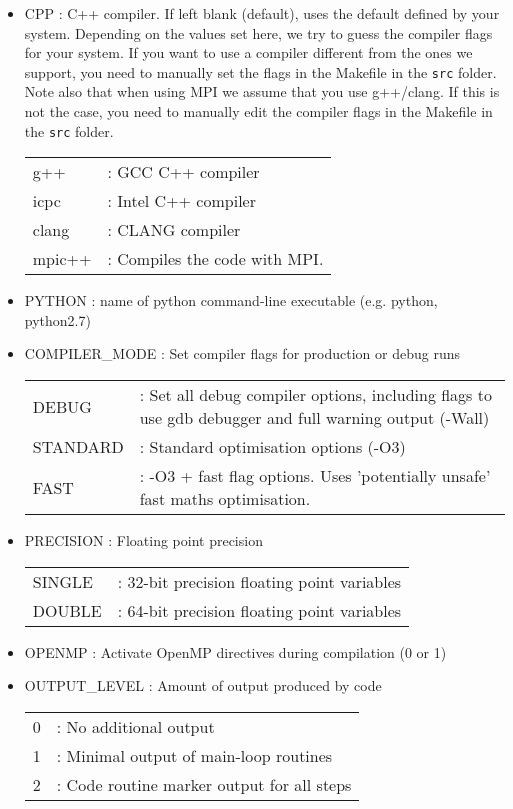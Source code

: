 \documentclass[a4paper]{article}
\newcommand{\var}[1]{\texttt{#1}}
\begin{document}
\begin{itemize}

\item CPP : C++ compiler. If left blank (default), uses the default defined by your system. Depending on the values set here, we try to guess the compiler flags for your system. If you want to use a compiler different from the ones we support, you need to manually set the flags in the Makefile in the \var{src} folder. Note also that when using MPI we assume that you use g++/clang. If this is not the case, you need to manually edit the compiler flags in the Makefile in the \var{src} folder.\\
\begin{tabular}{ll}
g++ & : GCC C++ compiler \\
icpc & : Intel C++ compiler \\
clang & : CLANG compiler\\
mpic++ & : Compiles the code with MPI.
\end{tabular}

\item PYTHON : name of python command-line executable (e.g. python, python2.7)

\item COMPILER\_MODE : Set compiler flags for production or debug runs \\
\begin{tabular}{ll}
DEBUG & : Set all debug compiler options, including flags to use gdb debugger and full warning output (-Wall) \\
STANDARD & : Standard optimisation options (-O3) \\
FAST & : -O3 + fast flag options.  Uses 'potentially unsafe' fast maths optimisation.
\end{tabular}

\item PRECISION : Floating point precision \\
\begin{tabular}{ll}
SINGLE & : 32-bit precision floating point variables \\
DOUBLE & : 64-bit precision floating point variables
\end{tabular}

\item OPENMP : Activate OpenMP directives during compilation (0 or 1)

\item OUTPUT\_LEVEL : Amount of output produced by code \\
\begin{tabular}{ll}
0 & : No additional output \\
1 & : Minimal output of main-loop routines \\
2 & : Code routine marker output for all steps
\end{tabular}


\end{itemize}
\end{document}
